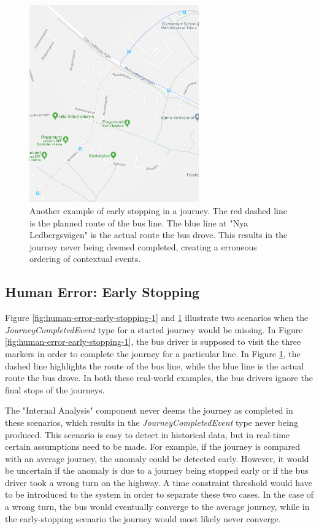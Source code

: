 \begin{figure}[t!]
    \centering
    \includegraphics[width=0.65\textwidth]{figures/lazy_driver_2}
    \caption{Another example of early stopping in a journey.
    The red dashed line is the planned route of the bus line.
    The blue line at "Nya Ledbergsvägen" is the actual route the bus drove.
    This results in the journey never being deemed completed, creating a erroneous ordering of contextual events.}
    \label{fig:human-error-early-stopping-2}
\end{figure}

\subsection{Human Error: Early Stopping}
Figure \ref{fig:human-error-early-stopping-1} and \ref{fig:human-error-early-stopping-2} illustrate two scenarios when the \textit{JourneyCompletedEvent} type for a started journey would be missing.
In Figure \ref{fig:human-error-early-stopping-1}, the bus driver is supposed to visit the three markers in order to complete the journey for a particular line.
In Figure \ref{fig:human-error-early-stopping-2}, the dashed line highlights the route of the bus line, while the blue line is the actual route the bus drove.
In both these real-world examples, the bus drivers ignore the final stops of the journeys.

The "Internal Analysis" component never deems the journey as completed in these scenarios, which results in the \textit{JourneyCompletedEvent} type never being produced.
This scenario is easy to detect in historical data, but in real-time certain assumptions need to be made.
For example, if the journey is compared with an average journey, the anomaly could be detected early.
However, it would be uncertain if the anomaly is due to a journey being stopped early or if the bus driver took a wrong turn on the highway.
A time constraint threshold would have to be introduced to the system in order to separate these two cases.
In the case of a wrong turn, the bus would eventually converge to the average journey, while in the early-stopping scenario the journey would most likely never converge.


